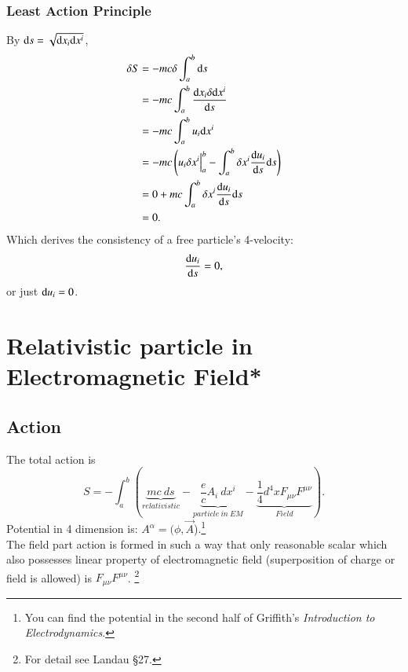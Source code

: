 \documentclass[openany,10pt]{book}
\theoremstyle{definition}
\theoremstyle{definition}
\theoremstyle{remark}
\begin{document}
\subsection{Least Action Principle}\label{LAP}
By ${\rm d}s=\sqrt{{\rm d}x_i{\rm d}x^i}$,
\begin{equation}\begin{aligned}
    {\rm \delta}S&=-mc{\rm \delta}\int_a^b {\rm d}s\\
    &=-mc\int^b_a \frac{{\rm d}x_i{\rm \delta}{\rm d}x^i}{{\rm d}s}\\
    &=-mc\int^b_a u_i{\rm d}x^i\\
    &=-mc\left(u_i{\rm \delta}x^i\Big|^b_a-\int^b_a{\rm \delta}x^i\frac{{\rm d}u_i}{{\rm d}s}{\rm d}s\right)\\
    &=0+mc\int^b_a{\rm \delta}x^i\frac{{\rm d}u_i}{{\rm d}s}{\rm d}s\\
    &=0.
\end{aligned}
\end{equation}
Which derives the consistency of a free particle's 4-velocity:
\begin{equation}
    \frac{{\rm d}u_i}{{\rm d}s}=0,
\end{equation}
or just ${\rm d}u_i=0$.

\chapter{Relativistic particle in Electromagnetic Field*}

\section{Action}\label{emaction}
The total action is
\begin{equation}\boxed{
S=-\int^b_a (\underbrace{mc \ ds}_{relativistic} - \underbrace{\frac e{c}A_i \ dx^i}_{particle \ in \  EM}-\underbrace{\frac{1}{4}d^4xF_{\mu\nu}F^{\mu\nu}}_{Field}).}
\end{equation}
Potential in 4 dimension is: $A^\alpha=(\phi,\vec{A}$).\footnote{You can find the potential in the second half of Griffith's \textit{Introduction to Electrodynamics}.}\\
The field part action is formed in such a way that only reasonable scalar which also possesses linear property of electromagnetic field (superposition of charge or field is allowed) is $F_{\mu\nu}F^{\mu\nu}$. \footnote{For detail see Landau \S 27.}
\end{document}
